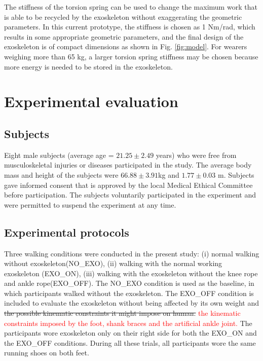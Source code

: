 \documentclass[twocolumn,cleanfoot,10pt]{asme2ej}
\begin{document}

The stiffness of the torsion spring can be used to change the maximum work that is able to be recycled by the exoskeleton without exaggerating the geometric parameters.
In this current prototype, the stiffness is chosen as 1 Nm/rad, which results in some appropriate geometric parameters, and the final design of the exoskeleton is of compact dimensions as shown in Fig. \ref{fig:model}.
For wearers weighing more than 65 kg, a larger torsion spring stiffness may be chosen because more energy is needed to be stored in the exoskeleton.

\section{Experimental evaluation}
\label{sec:experiment}

\subsection{Subjects}
Eight male subjects (average age = $21.25 \pm2.49$  years) who were free from musculoskeletal injuries or diseases participated in the study.
The average body mass and height of the subjects were $66.88\pm3.91$kg and $1.77\pm0.03$ m.
Subjects gave informed consent that is approved by the local Medical Ethical Committee before participation.
The subjects voluntarily participated in the experiment and were permitted to suspend the experiment at any time.   

\subsection{Experimental protocols}
Three walking conditions were conducted in the present study: (i) normal walking without exoskeleton(NO\_EXO), (ii) walking with the normal working exoskeleton (EXO\_ON), (iii) walking with the exoskeleton without the knee rope and ankle rope(EXO\_OFF).
The NO\_EXO condition is used as the baseline, in which participants walked without the exoskeleton.
The EXO\_OFF condition is included to evaluate the exoskeleton without being affected by its own weight and \sout{the possible kinematic constraints it might impose on human.} \textcolor{red}{the kinematic constraints imposed by the foot, shank braces and the artificial ankle joint.}
The participants wore exoskeleton only on their right side for both the EXO\_ON and the EXO\_OFF conditions.
During all these trials, all participants wore the same running shoes on both feet. 
\end{document}
